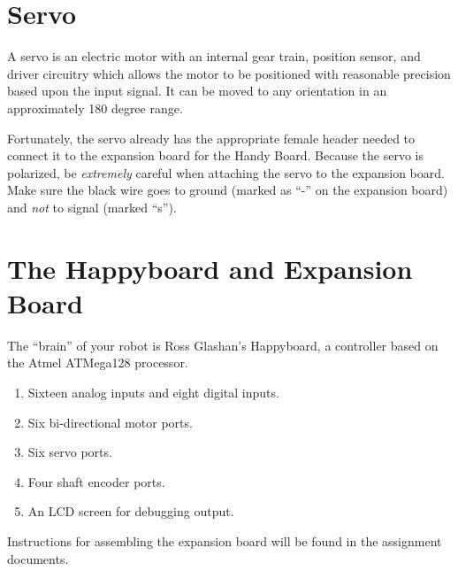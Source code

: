 \section{Servo}

A servo is an electric motor with an internal gear train, position
sensor, and driver circuitry which allows the motor to be positioned
with reasonable precision based upon the input signal. It can be moved
to any orientation in an approximately 180 degree range.

Fortunately, the servo already has the appropriate female header needed to connect it to the expansion board for the Handy Board. Because the servo is polarized, be {\it extremely} careful when attaching the servo to the expansion board. Make sure the black wire goes to ground (marked as ``-'' on the expansion board) and {\it not} to signal (marked ``s'').


\section{The Happyboard and Expansion Board}

The ``brain'' of your robot is Ross Glashan's Happyboard, a controller
based on the Atmel ATMega128 processor.

\begin{enumerate}
\item Sixteen analog inputs and eight digital inputs.
\item Six bi-directional motor ports.
\item Six servo ports.
\item Four shaft encoder ports.
\item An LCD screen for debugging output.
\end{enumerate}

Instructions for assembling the expansion board will be found in the assignment
documents.
